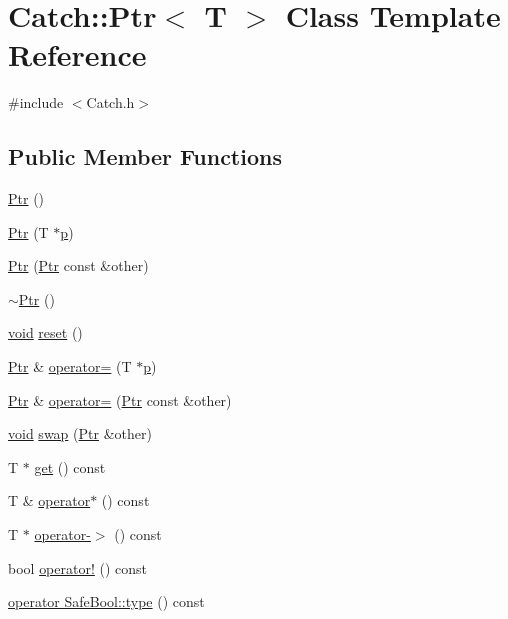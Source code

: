\hypertarget{class_catch_1_1_ptr}{}\section{Catch\+:\+:Ptr$<$ T $>$ Class Template Reference}
\label{class_catch_1_1_ptr}


{\ttfamily \#include $<$Catch.\+h$>$}

\subsection*{Public Member Functions}
\begin{DoxyCompactItemize}
\item 
\hyperlink{class_catch_1_1_ptr_a6108f0195595ee9d7a411daea810beaf}{Ptr} ()
\item 
\hyperlink{class_catch_1_1_ptr_aacec063a79cd142e39040a31c6b3c40b}{Ptr} (T $\ast$\hyperlink{_s_d_l__opengl__glext_8h_aa5367c14d90f462230c2611b81b41d23}{p})
\item 
\hyperlink{class_catch_1_1_ptr_ac629dd8ebe5763a37bb89e6c1d6a1771}{Ptr} (\hyperlink{class_catch_1_1_ptr}{Ptr} const \&other)
\item 
\hyperlink{class_catch_1_1_ptr_ac96d3bb33adcfb983207385cfba5fe8a}{$\sim$\+Ptr} ()
\item 
\hyperlink{_s_d_l__opengles2__gl2ext_8h_ae5d8fa23ad07c48bb609509eae494c95}{void} \hyperlink{class_catch_1_1_ptr_af8d0fa7a2cd20842830b354ac31dfe5c}{reset} ()
\item 
\hyperlink{class_catch_1_1_ptr}{Ptr} \& \hyperlink{class_catch_1_1_ptr_a9b08c868b447d679ed201921f5c94683}{operator=} (T $\ast$\hyperlink{_s_d_l__opengl__glext_8h_aa5367c14d90f462230c2611b81b41d23}{p})
\item 
\hyperlink{class_catch_1_1_ptr}{Ptr} \& \hyperlink{class_catch_1_1_ptr_af42074444c1bc6a70ebdc406a8617708}{operator=} (\hyperlink{class_catch_1_1_ptr}{Ptr} const \&other)
\item 
\hyperlink{_s_d_l__opengles2__gl2ext_8h_ae5d8fa23ad07c48bb609509eae494c95}{void} \hyperlink{class_catch_1_1_ptr_a172bf8b4e71e26a5a4d92f5b02158b50}{swap} (\hyperlink{class_catch_1_1_ptr}{Ptr} \&other)
\item 
T $\ast$ \hyperlink{class_catch_1_1_ptr_a1617aa5ff058b53ea572cf965617b7ae}{get} () const 
\item 
T \& \hyperlink{class_catch_1_1_ptr_a3a4c139032a8bd1bffa553103d5dbfd3}{operator$\ast$} () const 
\item 
T $\ast$ \hyperlink{class_catch_1_1_ptr_afaa13250d5e0ae5a440726d5e5aa7295}{operator-\/$>$} () const 
\item 
bool \hyperlink{class_catch_1_1_ptr_aea1a99ded6d62423ccb9173fab91b56e}{operator!} () const 
\item 
\hyperlink{class_catch_1_1_ptr_a27234c04feec43ffe0fd08e045557448}{operator Safe\+Bool\+::type} () const 
\end{DoxyCompactItemize}


